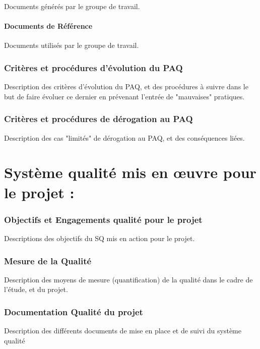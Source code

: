 \documentclass[a4paper, 18pt]{article}
\begin{document}
Documents générés par le groupe de travail.

\subsection{Documents de Référence}

Documents utilisés par le groupe de travail.

\section{Critères et procédures d'évolution du PAQ}

Description des critères d'évolution du PAQ, et des procédures à suivre dans le but de faire évoluer ce dernier en prévenant l'entrée de "mauvaises" pratiques.

\section{Critères et procédures de dérogation au PAQ}

Description des cas "limités" de dérogation au PAQ, et des conséquences liées.

\part{Système qualité mis en œuvre pour le projet :}

\section{Objectifs et Engagements qualité pour le projet}

Descriptions des objectifs du SQ mis en action pour le projet.

\section{Mesure de la Qualité}

Description des moyens de mesure (quantification) de la qualité dans le cadre de l'étude, et du projet.

\section{Documentation Qualité du projet}

Description des différents documents de mise en place et de suivi du système qualité
\end{document}
